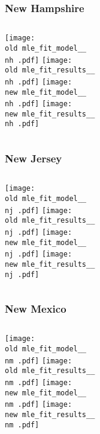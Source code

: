 \documentclass{beamer}
\newcommand{\old}{current_two_stage_output/pyseir/state_summaries/reports/}
\newcommand{\new}{new_shortest_t_delta/pyseir/state_summaries/reports/}
\newcommand{\nh}{New Hampshire__33}
\newcommand{\nj}{New Jersey__34}
\newcommand{\nm}{New Mexico__35}
\begin{document}
\begin{frame}
\frametitle{New Hampshire}
    \begin{columns}[t]

       \texttt{[image: \\old mle\_fit\_model\_\_\\nh .pdf]}
       \texttt{[image: \\old mle\_fit\_results\_\_\\nh .pdf]}   
       \texttt{[image: \\new mle\_fit\_model\_\_\\nh .pdf]}
       \texttt{[image: \\new mle\_fit\_results\_\_\\nh .pdf]}   
\end{columns}
\end{frame}

\begin{frame}
\frametitle{New Jersey}
    \begin{columns}[t]

       \texttt{[image: \\old mle\_fit\_model\_\_\\nj .pdf]}
       \texttt{[image: \\old mle\_fit\_results\_\_\\nj .pdf]}   
       \texttt{[image: \\new mle\_fit\_model\_\_\\nj .pdf]}
       \texttt{[image: \\new mle\_fit\_results\_\_\\nj .pdf]}   
\end{columns}
\end{frame}

\begin{frame}
\frametitle{New Mexico}
    \begin{columns}[t]

       \texttt{[image: \\old mle\_fit\_model\_\_\\nm .pdf]}
       \texttt{[image: \\old mle\_fit\_results\_\_\\nm .pdf]}   
       \texttt{[image: \\new mle\_fit\_model\_\_\\nm .pdf]}
       \texttt{[image: \\new mle\_fit\_results\_\_\\nm .pdf]}   
\end{columns}
\end{frame}
\end{document}
